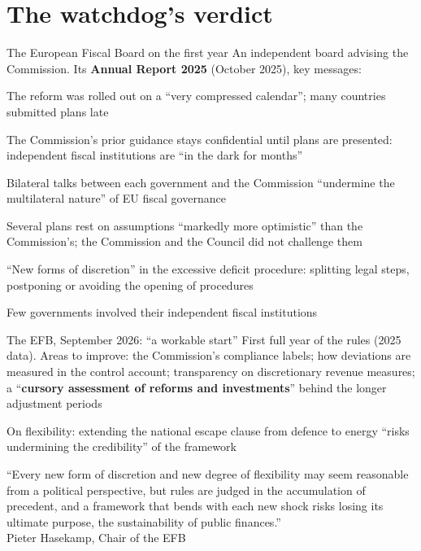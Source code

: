 \documentclass[aspectratio=169,xcolor=table]{beamer}
\begin{document}
\section{The watchdog's verdict}

\begin{frame}{The European Fiscal Board on the first year}
\footnotesize
An independent board advising the Commission. Its \textbf{Annual Report 2025} (October 2025), key messages:
\bi
  \item The reform was rolled out on a ``very compressed calendar''; many countries submitted plans late
  \item The Commission's prior guidance stays confidential until plans are presented: independent fiscal institutions are ``in the dark for months''
  \item Bilateral talks between each government and the Commission ``undermine the multilateral nature'' of EU fiscal governance
  \item Several plans rest on assumptions ``markedly more optimistic'' than the Commission's; the Commission and the Council did not challenge them
  \item ``New forms of discretion'' in the excessive deficit procedure: splitting legal steps, postponing or avoiding the opening of procedures
  \item Few governments involved their independent fiscal institutions
\ei
{}
\end{frame}

\begin{frame}{The EFB, September 2026: ``a workable start''}
\footnotesize
First full year of the rules (2025 data). Areas to improve: the Commission's compliance labels; how deviations are measured in the control account; transparency on discretionary revenue measures; a ``\textbf{cursory assessment of reforms and investments}'' behind the longer adjustment periods
\vspace{0.1cm}

On flexibility: extending the national escape clause from defence to energy ``risks undermining the credibility'' of the framework
\vspace{0.1cm}

\begin{block}{}
\footnotesize ``Every new form of discretion and new degree of flexibility may seem reasonable from a political perspective, but rules are judged in the accumulation of precedent, and a framework that bends with each new shock risks losing its ultimate purpose, the sustainability of public finances.''\\
\hfill Pieter Hasekamp, Chair of the EFB
\end{block}
\end{frame}
\end{document}
